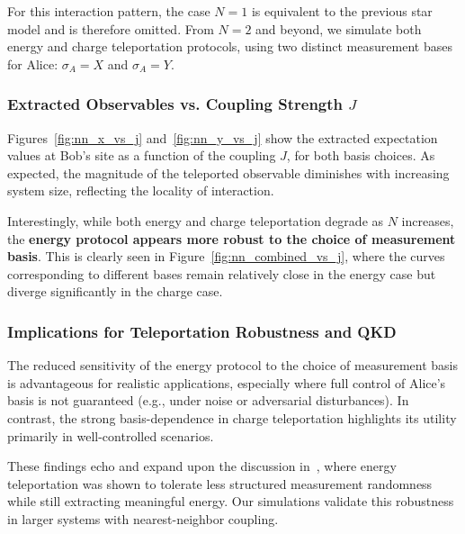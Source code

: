 For this interaction pattern, the case \( N = 1 \) is equivalent to the previous star model and is therefore omitted. From \( N = 2 \) and beyond, we simulate both energy and charge teleportation protocols, using two distinct measurement bases for Alice: \( \sigma_A = X \) and \( \sigma_A = Y \).

\subsubsection{Extracted Observables vs. Coupling Strength \texorpdfstring{\( J \)}{J}}

Figures~\ref{fig:nn_x_vs_j} and~\ref{fig:nn_y_vs_j} show the extracted expectation values at Bob’s site as a function of the coupling \( J \), for both basis choices. As expected, the magnitude of the teleported observable diminishes with increasing system size, reflecting the locality of interaction.

Interestingly, while both energy and charge teleportation degrade as \( N \) increases, the \textbf{energy protocol appears more robust to the choice of measurement basis}. This is clearly seen in Figure~\ref{fig:nn_combined_vs_j}, where the curves corresponding to different bases remain relatively close in the energy case but diverge significantly in the charge case.

\subsubsection{Implications for Teleportation Robustness and QKD}

The reduced sensitivity of the energy protocol to the choice of measurement basis is advantageous for realistic applications, especially where full control of Alice’s basis is not guaranteed (e.g., under noise or adversarial disturbances). In contrast, the strong basis-dependence in charge teleportation highlights its utility primarily in well-controlled scenarios.

These findings echo and expand upon the discussion in~\cite{IkedaTeleportingCharge, QKDbyQET}, where energy teleportation was shown to tolerate less structured measurement randomness while still extracting meaningful energy. Our simulations validate this robustness in larger systems with nearest-neighbor coupling.
